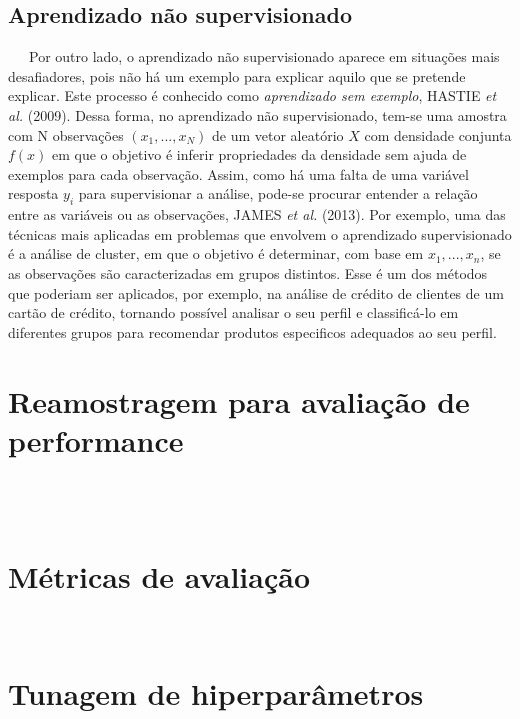 \documentclass[
  12pt,
  letterpaper,
  DIV=11,
  numbers=noendperiod]{scrreprt}
\begin{document}
\subsection{Aprendizado não
supervisionado}\label{aprendizado-nuxe3o-supervisionado}

~~~Por outro lado, o aprendizado não supervisionado aparece em situações
mais desafiadores, pois não há um exemplo para explicar aquilo que se
pretende explicar. Este processo é conhecido como \emph{aprendizado sem
exemplo}, HASTIE \emph{et al.} (2009). Dessa forma, no aprendizado não
supervisionado, tem-se uma amostra com N observações
\(\left(x_1, ..., x_N\right)\) de um vetor aleatório \(X\) com densidade
conjunta \(f\left(x\right)\) em que o objetivo é inferir propriedades da
densidade sem ajuda de exemplos para cada observação. Assim, como há uma
falta de uma variável resposta \(y_i\) para supervisionar a análise,
pode-se procurar entender a relação entre as variáveis ou as
observações, JAMES \emph{et al.} (2013). Por exemplo, uma das técnicas
mais aplicadas em problemas que envolvem o aprendizado supervisionado é
a análise de cluster, em que o objetivo é determinar, com base em
\(x_1, ..., x_n\), se as observações são caracterizadas em grupos
distintos. Esse é um dos métodos que poderiam ser aplicados, por
exemplo, na análise de crédito de clientes de um cartão de crédito,
tornando possível analisar o seu perfil e classificá-lo em diferentes
grupos para recomendar produtos especificos adequados ao seu perfil.

\section{Reamostragem para avaliação de
performance}\label{reamostragem-para-avaliauxe7uxe3o-de-performance}

~~\\

~~\\

\section{Métricas de avaliação}\label{muxe9tricas-de-avaliauxe7uxe3o}

~~\\

\section{Tunagem de
hiperparâmetros}\label{tunagem-de-hiperparuxe2metros}
\end{document}
